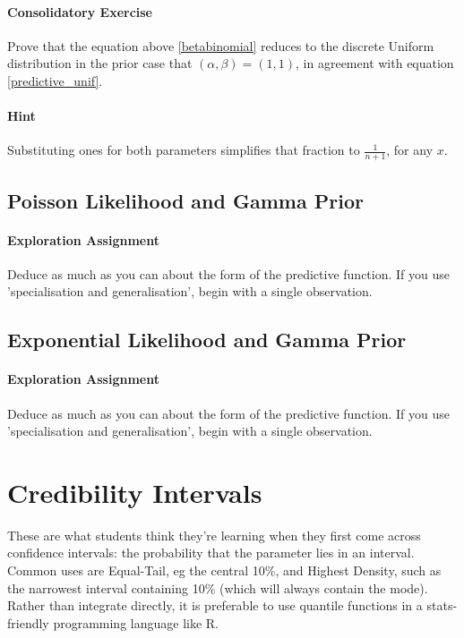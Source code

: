 \documentclass{article}
\begin{document}
\begin{Exercise}
    \paragraph{Consolidatory Exercise} Prove that the equation above \eqref{betabinomial} reduces to the discrete Uniform distribution in the prior case that $(\alpha,\beta)=(1,1)$, in agreement with equation \eqref{predictive_unif}.
    
    \paragraph{Hint}
    Substituting ones for both parameters simplifies that fraction to $\frac{1}{n+1}$, for any $x$.
\end{Exercise}

\subsection{Poisson Likelihood and Gamma Prior}

\begin{Exercise}
\paragraph{Exploration Assignment}
    Deduce as much as you can about the form of the predictive function. If you use 'specialisation and generalisation', begin with a single observation.
\end{Exercise}

\subsection{Exponential Likelihood and Gamma Prior}

\begin{Exercise}
\paragraph{Exploration Assignment}
    Deduce as much as you can about the form of the predictive function. If you use 'specialisation and generalisation', begin with a single observation.
\end{Exercise}

\section{Credibility Intervals}
These are what students think they're learning when they first come across confidence intervals: the probability that the parameter lies in an interval. Common uses are Equal-Tail, eg the central 10\%, and Highest Density, such as the narrowest interval containing 10\% (which will always contain the mode). Rather than integrate directly, it is preferable to use quantile functions in a stats-friendly programming language like R.
\end{document}
